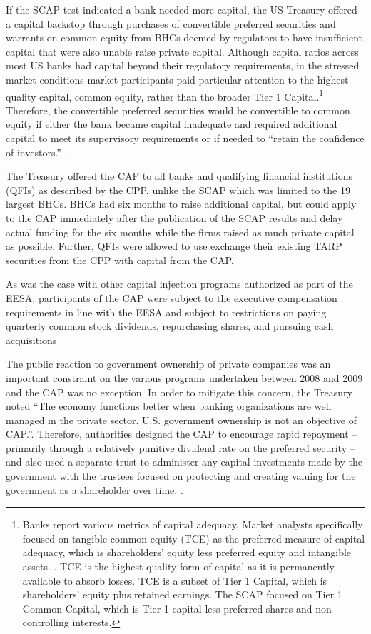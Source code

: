 \documentclass[12pt]{article}
\begin{document}
If the SCAP test indicated a bank needed more capital, the US Treasury offered a capital backstop through purchases of convertible preferred securities and warrants on common equity from BHCs deemed by regulators to have insufficient capital that were also unable raise private capital. Although capital ratios across most US banks had capital beyond their regulatory requirements, in the stressed market conditions market participants paid particular attention to the highest quality capital, common equity, rather than the broader Tier 1 Capital.\footnote{Banks report various metrics of capital adequacy. Market analysts specifically focused on tangible common equity (TCE) as the preferred measure of capital adequacy, which is shareholders’ equity less preferred equity and intangible assets. \citep{GW}. TCE is the highest quality form of capital as it is permanently available to absorb losses. TCE is a subset of Tier 1 Capital, which is shareholders’ equity plus retained earnings. The SCAP focused on Tier 1 Common Capital, which is Tier 1 capital less preferred shares and non-controlling interests.} Therefore, the convertible preferred securities would be convertible to common equity if either the bank became capital inadequate and required additional capital to meet its supervisory requirements or if needed to ``retain the confidence of investors.'' \citep{WhitePaper}.


The Treasury offered the CAP to all banks and qualifying financial institutions (QFIs) as described by the CPP, unlike the SCAP which was limited to the 19 largest BHCs. BHCs had six months to raise additional capital, but could apply to the CAP immediately after the publication of the SCAP results and delay actual funding for the six months while the firms raised as much private capital as possible. Further, QFIs were allowed to use exchange their existing TARP securities from the CPP with capital from the CAP. 


As was the case with other capital injection programs authorized as part of the EESA, participants of the CAP were subject to the executive compensation requirements in line with the EESA and subject to restrictions on paying quarterly common stock dividends, repurchasing shares, and pursuing cash acquisitions


The public reaction to government ownership of private companies was an important constraint on the various programs undertaken between 2008 and 2009 and the CAP was no exception. In order to mitigate this concern, the Treasury noted “The economy functions better when banking organizations are well managed in the private sector. U.S. government ownership is not an objective of CAP.''\citep{WhitePaper}. Therefore, authorities designed the CAP to encourage rapid repayment -- primarily through a relatively punitive dividend rate on the preferred security -- and also used a separate trust to administer any capital investments made by the government with the trustees focused on protecting and creating valuing for the government as a shareholder over time. \citep{WhitePaper}.
\end{document}
